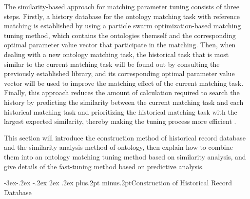 \documentclass[twoside]{article}
\makeatletter
\def\subsection{\@startsection{subsection}{2}{\z@}%
 {-3ex\@plus -.2ex \@minus -.2ex}%
 {2ex \@plus.2ex}%
{\normalfont\normalsize\protect\baselineskip=12.5pt plus.2pt minus.2pt\bfseries}}
\makeatother
\begin{document}
The similarity-based approach for matching parameter tuning consists of three steps.
Firstly, a history database for the ontology matching task with reference matching is established by using a particle swarm optimization-based matching tuning method, which contains the ontologies themself and the corresponding optimal parameter value vector that participate in the matching.
Then, when dealing with a new ontology matching task, the historical task that is most similar to the current matching task will be found out by consulting the previously established library, and its corresponding optimal parameter value vector will be used to improve the matching effect of the current matching task.
Finally, this approach reduces the amount of calculation required to search the history by predicting the similarity between the current matching task and each historical matching task and prioritizing the historical matching task with the largest expected similarity, thereby making the tuning process more efficient .


This section will introduce the construction method of historical record database and the similarity analysis method of ontology, then explain how to combine them into an ontology matching tuning method based on similarity analysis, and give details of the fast-tuning method based on predictive analysis.




\subsection{Construction of Historical Record Database}
\end{document}
